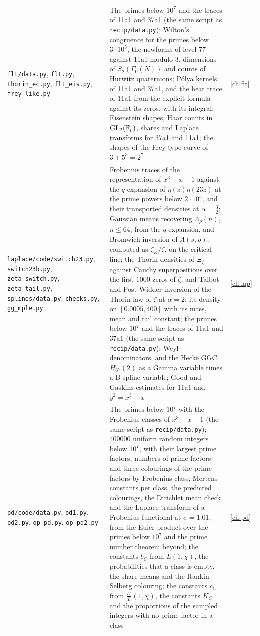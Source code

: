 {\begin{longtable}{p{1.4in}p{2.95in}p{0.6in}}
\texttt{flt/data.py}, \texttt{flt.py}, \texttt{thorin\_ec.py}, \texttt{flt\_eis.py}, \texttt{frey\_like.py} & The primes below $10^7$ and the traces of 11a1 and 37a1 (the same script as \texttt{recip/data.py}); Wilton's congruence for the primes below $3\cdot10^5$, the newforms of level $77$ against 11a1 modulo $3$, dimensions of $S_2(\Gamma_0(N))$ and counts of Hurwitz quaternions; P\'olya kernels of 11a1 and 37a1, and the heat trace of 11a1 from the explicit formula against its zeros, with its integral; Eisenstein shapes, Haar counts in $\mathrm{GL}_2(\mathbb F_p)$, shares and Laplace transforms for 37a1 and 11a1; the shapes of the Frey type curve of $3+5^3=2^7$ & \ref{ch:flt}\\
\texttt{laplace/\allowbreak code/\allowbreak switch23.py}, \texttt{switch23b.py}, \texttt{zeta\_switch.py}, \texttt{zeta\_tail.py}, \texttt{splines/\allowbreak data.py}, \texttt{checks.py}, \texttt{gg\_mple.py} & Frobenius traces of the representation of $x^3-x-1$ against the $q$ expansion of $\eta(z)\eta(23z)$ at the prime powers below $2\cdot10^5$, and their transported densities at $\alpha=\frac32$; Gaussian means recovering $\Lambda_\rho(n)$, $n\le64$, from the $q$ expansion, and Bromwich inversion of $\Lambda(s,\rho)$, computed as $\zeta_K/\zeta$, on the critical line; the Thorin densities of $\Xi_\zeta$ against Cauchy superpositions over the first $1000$ zeros of $\zeta$, and Talbot and Post Widder inversion of the Thorin law of $\zeta$ at $\alpha=2$; its density on $[0.0005,400]$ with its mass, mean and tail constant; the primes below $10^7$ and the traces of 11a1 and 37a1 (the same script as \texttt{recip/data.py}); Weyl denominators, and the Hecke GGC $H_{67}(2)$ as a Gamma variable times a B spline variable; Good and Gaskins estimates for 11a1 and $y^2=x^3-x$ & \ref{ch:lap}\\
\texttt{pd/\allowbreak code/\allowbreak data.py}, \texttt{pd1.py}, \texttt{pd2.py}, \texttt{op\_pd.py}, \texttt{op\_pd2.py} & The primes below $10^7$ with the Frobenius classes of $x^3-x-1$ (the same script as \texttt{recip/data.py}); $400000$ uniform random integers below $10^7$, with their largest prime factors, numbers of prime factors and three colourings of the prime factors by Frobenius class; Mertens constants per class, the predicted colourings, the Dirichlet mean check and the Laplace transform of a Frobenius functional at $\sigma=1.01$, from the Euler product over the primes below $10^7$ and the prime number theorem beyond; the constants $b_C$ from $L(1,\chi)$, the probabilities that a class is empty, the share means and the Rankin Selberg colouring; the constants $c_C$ from $\frac{L'}L(1,\chi)$, the constants $K_C$ and the proportions of the sampled integers with no prime factor in a class & \ref{ch:pd}\\

\end{longtable}}
